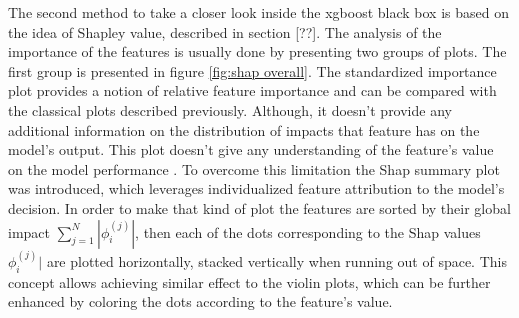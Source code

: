 The second method to take a closer look inside the xgboost black box is based on the idea of Shapley value, described in section [??]. The analysis of the importance of the features is usually done by presenting two groups of plots. The first group is presented in figure \ref{fig:shap overall}. The standardized importance plot provides a notion of relative feature importance and can be compared with the classical plots described previously. Although, it doesn't provide any additional information on the distribution of impacts that feature has on the model's output. This plot doesn't give any understanding of the feature's value on the model performance  \cite{Shap2}. To overcome this limitation the Shap summary plot was introduced, which leverages individualized feature attribution to the model's decision. In order to make that kind of plot the features are sorted by their global impact $\sum_{j=1}^{N}|\phi_i^{(j)}|$, then each of the dots corresponding to the Shap values $\phi_i^{(j)}|$ are plotted horizontally, stacked vertically when running out of space. This concept allows achieving similar effect to the violin plots, which can be further enhanced by coloring the dots according to the feature's value. 


